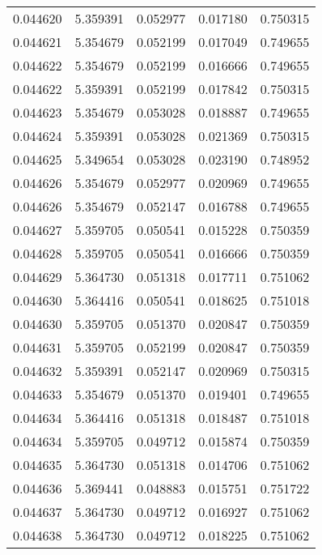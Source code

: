 \begin{tabular}{lrrrr}
0.044620    &  5.359391 &  0.052977 &  0.017180 &             0.750315 \\
0.044621    &  5.354679 &  0.052199 &  0.017049 &             0.749655 \\
0.044622    &  5.354679 &  0.052199 &  0.016666 &             0.749655 \\
0.044622    &  5.359391 &  0.052199 &  0.017842 &             0.750315 \\
0.044623    &  5.354679 &  0.053028 &  0.018887 &             0.749655 \\
0.044624    &  5.359391 &  0.053028 &  0.021369 &             0.750315 \\
0.044625    &  5.349654 &  0.053028 &  0.023190 &             0.748952 \\
0.044626    &  5.354679 &  0.052977 &  0.020969 &             0.749655 \\
0.044626    &  5.354679 &  0.052147 &  0.016788 &             0.749655 \\
0.044627    &  5.359705 &  0.050541 &  0.015228 &             0.750359 \\
0.044628    &  5.359705 &  0.050541 &  0.016666 &             0.750359 \\
0.044629    &  5.364730 &  0.051318 &  0.017711 &             0.751062 \\
0.044630    &  5.364416 &  0.050541 &  0.018625 &             0.751018 \\
0.044630    &  5.359705 &  0.051370 &  0.020847 &             0.750359 \\
0.044631    &  5.359705 &  0.052199 &  0.020847 &             0.750359 \\
0.044632    &  5.359391 &  0.052147 &  0.020969 &             0.750315 \\
0.044633    &  5.354679 &  0.051370 &  0.019401 &             0.749655 \\
0.044634    &  5.364416 &  0.051318 &  0.018487 &             0.751018 \\
0.044634    &  5.359705 &  0.049712 &  0.015874 &             0.750359 \\
0.044635    &  5.364730 &  0.051318 &  0.014706 &             0.751062 \\
0.044636    &  5.369441 &  0.048883 &  0.015751 &             0.751722 \\
0.044637    &  5.364730 &  0.049712 &  0.016927 &             0.751062 \\
0.044638    &  5.364730 &  0.049712 &  0.018225 &             0.751062 \\

\end{tabular}
